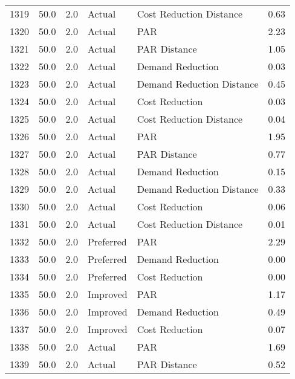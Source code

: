 \begin{longtable}{lrrllr}
1319 &         50.0 &     2.0 &         Actual &    Cost Reduction Distance &   0.63 \\
1320 &         50.0 &     2.0 &         Actual &                        PAR &   2.23 \\
1321 &         50.0 &     2.0 &         Actual &               PAR Distance &   1.05 \\
1322 &         50.0 &     2.0 &         Actual &           Demand Reduction &   0.03 \\
1323 &         50.0 &     2.0 &         Actual &  Demand Reduction Distance &   0.45 \\
1324 &         50.0 &     2.0 &         Actual &             Cost Reduction &   0.03 \\
1325 &         50.0 &     2.0 &         Actual &    Cost Reduction Distance &   0.04 \\
1326 &         50.0 &     2.0 &         Actual &                        PAR &   1.95 \\
1327 &         50.0 &     2.0 &         Actual &               PAR Distance &   0.77 \\
1328 &         50.0 &     2.0 &         Actual &           Demand Reduction &   0.15 \\
1329 &         50.0 &     2.0 &         Actual &  Demand Reduction Distance &   0.33 \\
1330 &         50.0 &     2.0 &         Actual &             Cost Reduction &   0.06 \\
1331 &         50.0 &     2.0 &         Actual &    Cost Reduction Distance &   0.01 \\
1332 &         50.0 &     2.0 &      Preferred &                        PAR &   2.29 \\
1333 &         50.0 &     2.0 &      Preferred &           Demand Reduction &   0.00 \\
1334 &         50.0 &     2.0 &      Preferred &             Cost Reduction &   0.00 \\
1335 &         50.0 &     2.0 &       Improved &                        PAR &   1.17 \\
1336 &         50.0 &     2.0 &       Improved &           Demand Reduction &   0.49 \\
1337 &         50.0 &     2.0 &       Improved &             Cost Reduction &   0.07 \\
1338 &         50.0 &     2.0 &         Actual &                        PAR &   1.69 \\
1339 &         50.0 &     2.0 &         Actual &               PAR Distance &   0.52 \\

\end{longtable}
